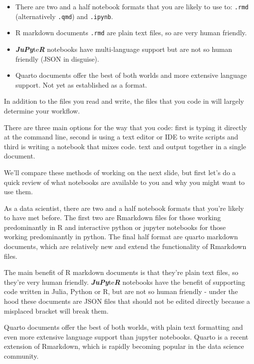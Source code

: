 \documentclass[
  12pt,
]{book}
\begin{document}
\begin{itemize}
\item
  There are two and a half notebook formats that you are likely to use to: \texttt{.rmd} (alternatively \texttt{.qmd}) and \texttt{.ipynb}.
\item
  R markdown documents \texttt{.rmd} are plain text files, so are very human friendly.
\item
  \textbf{\emph{JuPy}}te\textbf{\emph{R}} notebooks have multi-language support but are not so human friendly (JSON in disguise).
\item
  Quarto documents offer the best of both worlds and more extensive language support. Not yet as established as a format.
\end{itemize}

In addition to the files you read and write, the files that you code in will largely determine your workflow.

There are three main options for the way that you code: first is typing it directly at the command line, second is using a text editor or IDE to write scripts and third is writing a notebook that mixes code. text and output together in a single document.

We'll compare these methods of working on the next slide, but first let's do a quick review of what notebooks are available to you and why you might want to use them.

As a data scientist, there are two and a half notebook formats that you're likely to have met before. The first two are Rmarkdown files for those working predominantly in R and interactive python or jupyter notebooks for those working predominantly in python. The final half format are quarto markdown documents, which are relatively new and extend the functionality of Rmarkdown files.

The main benefit of R markdown documents is that they're plain text files, so they're very human friendly. \textbf{\emph{JuPy}}te\textbf{\emph{R}} notebooks have the benefit of supporting code written in Julia, Python or R, but are not so human friendly - under the hood these documents are JSON files that should not be edited directly because a misplaced bracket will break them.

Quarto documents offer the best of both worlds, with plain text formatting and even more extensive language support than jupyter notebooks. Quarto is a recent extension of Rmarkdown, which is rapidly becoming popular in the data science community.
\end{document}
